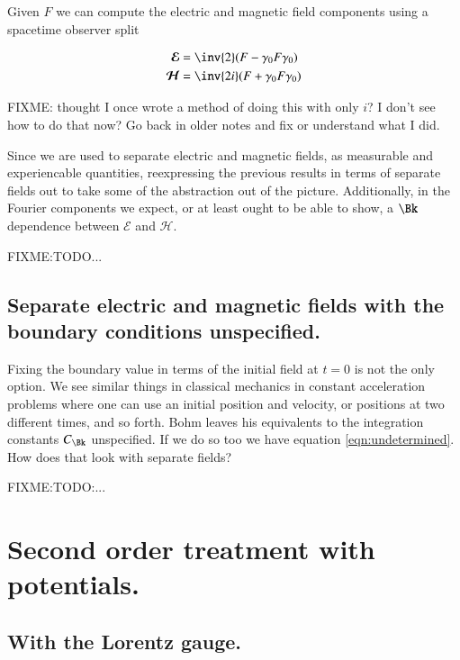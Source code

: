 \documentclass{article}
\newcommand{\EE}[0]{\boldsymbol{\mathcal{E}}}
\newcommand{\HH}[0]{\boldsymbol{\mathcal{H}}}
\begin{document}
Given $F$ we can compute the electric and magnetic field components using a spacetime observer split

\begin{align*}
\EE &= \inv{2}(F - \gamma_0 F \gamma_0 ) \\
\HH &= \inv{2i}(F + \gamma_0 F \gamma_0 ) \\
\end{align*}

FIXME: thought I once wrote a method of doing this with only $i$?  I don't see how to do that now?  Go back in older notes and fix or understand what I did.

Since we are used to separate electric and magnetic fields, as measurable and experiencable quantities, reexpressing the previous results 
in terms of separate fields out to take some of the abstraction out of the picture.  Additionally, in the Fourier components we expect, or at least ought to be able to show, a $\Bk$ dependence between $\EE$ and $\HH$.

FIXME:TODO...

\subsection{ Separate electric and magnetic fields with the boundary conditions unspecified. }

Fixing the boundary value in terms of the initial field at $t=0$ is not the only option.  We see similar things in classical mechanics in constant acceleration problems where one can use an initial position and velocity, or positions at two different times, and so forth.  Bohm leaves his equivalents to the integration constants $C_{\Bk}$ unspecified.  If we do so too we have equation \ref{eqn:undetermined}.  How does that look with separate fields?

FIXME:TODO:...

\section{ Second order treatment with potentials. }

\subsection{ With the Lorentz gauge. }




\end{document}
